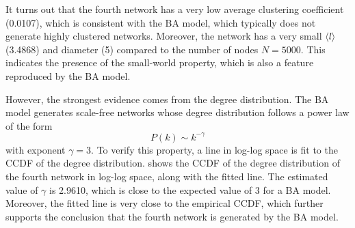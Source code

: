\documentclass{article}
\begin{document}
It turns out that the fourth network has a very low average clustering coefficient (0.0107), which is consistent with the BA model, which typically does not generate highly clustered networks. Moreover, the network has a very small $\langle l \rangle$ (3.4868) and diameter (5) compared to the number of nodes $N = 5000$. This indicates the presence of the small-world property, which is also a feature reproduced by the BA model.

However, the strongest evidence comes from the degree distribution. The BA model generates scale-free networks whose degree distribution follows a power law of the form
\begin{equation}
    P(k) \sim k^{-\gamma}
\end{equation}
with exponent $\gamma = 3$. To verify this property, a line in log-log space is fit to the CCDF of the degree distribution.  shows the CCDF of the degree distribution of the fourth network in log-log space, along with the fitted line. The estimated value of $\gamma$ is 2.9610, which is close to the expected value of 3 for a BA model. Moreover, the fitted line is very close to the empirical CCDF, which further supports the conclusion that the fourth network is generated by the BA model.
\end{document}
